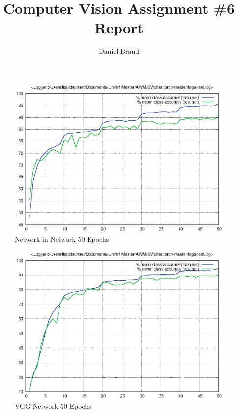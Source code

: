 \documentclass[11pt, oneside]{report}
\title{Computer Vision Assignment \#6 Report}
\author{Daniel Brand}
\date{}
\begin{document}
\maketitle

\begin{figure}[!htb]
\centering
\includegraphics[scale=.7]{logs_nin/test.eps}
\caption{Network in Network 50 Epochs}
\label{fig:digraph}
\end{figure}

\begin{figure}[!htb]
\centering
\includegraphics[scale=.7]{logs_vgg/test.eps}
\caption{VGG-Network 50 Epochs}
\label{fig:digraph}
\end{figure}
\end{document}
